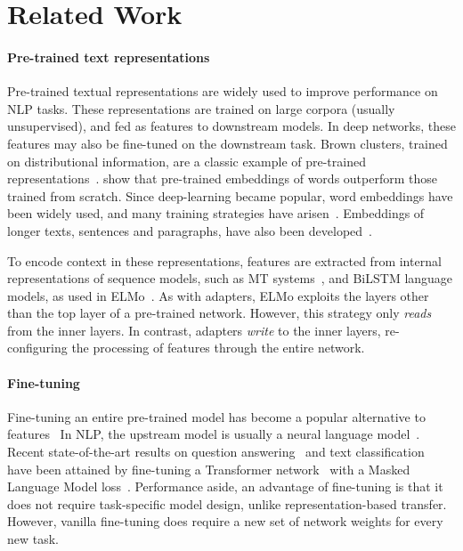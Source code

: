 \section{Related Work}

\paragraph{Pre-trained text representations}
Pre-trained textual representations are widely used to improve performance on NLP tasks.
These representations are trained on large corpora (usually unsupervised), and fed as features to downstream models.
In deep networks, these features may also be fine-tuned on the downstream task.
Brown clusters, trained on distributional information, are a classic example of pre-trained representations~\citep{brown1992}.
\citet{turian2010} show that pre-trained embeddings of words outperform those trained from scratch.
Since deep-learning became popular, word embeddings have been widely used, and many training strategies have arisen~\citep{mikolov2013,pennington2014,bojanowski2017enriching}.
Embeddings of longer texts, sentences and paragraphs, have also been developed~\citep{le2014,kiros2015,conneau2017,cer2019}.

To encode context in these representations, features are extracted from internal representations of sequence models,
such as MT systems~\citep{mccann2017}, and BiLSTM language models, as used in ELMo~\citep{peters2018}.
As with adapters, ELMo exploits the layers other than the top layer of a pre-trained network.
However, this strategy only \emph{reads} from the inner layers.
In contrast, adapters \emph{write} to the inner layers, re-configuring the processing of features through the entire network.

\paragraph{Fine-tuning}
Fine-tuning an entire pre-trained model has become a popular alternative to features~\citep{dai2015,howard2018universal,radford2018improving}
In NLP, the upstream model is usually a neural language model~\citep{bengio2003}.
Recent state-of-the-art results on question answering~\citep{rajpurkar2016} and text classification~\citep{wang2018glue} have been attained by fine-tuning a Transformer network~\citep{vaswani2017} with a Masked Language Model loss~\citep{devlin2018bert}.
Performance aside, an advantage of fine-tuning is that it does not require task-specific model design, unlike representation-based transfer.
However, vanilla fine-tuning does require a new set of network weights for every new task.

